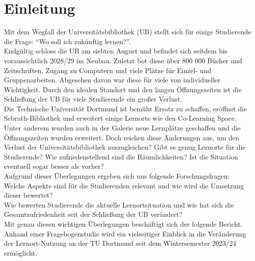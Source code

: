 \documentclass[11pt, a4paper]{article}
\begin{document}
\section{Einleitung}
\label{Einleitung}
Mit dem Wegfall der Universitätsbibliothek (UB) stellt sich für einige Studierende die Frage: “Wo soll ich zukünftig lernen?”.\\
Endgültig schloss die UB am siebten August und befindet sich seitdem bis voraussichtlich 2028/29 im Neubau. Zuletzt bot diese über 800 000 Bücher und Zeitschriften, Zugang zu Computern und viele Plätze für Einzel- und Gruppenarbeiten. Abgesehen davon war diese für viele von individueller Wichtigkeit.
Durch den idealen Standort und den langen Öffnungszeiten ist die Schließung der UB für viele Studierende ein großer Verlust.\\
Die Technische Universität Dortmund ist bemüht Ersatz zu schaffen, eröffnet die Sebrath-Bibliothek und erweitert einige Lernorte wie den Co-Learning Space.
Unter anderem wurden auch in der Galerie neue Lernplätze geschaffen und die Öffnungszeiten wurden erweitert.
Doch reichen diese Änderungen aus, um den Verlust der Universitätsbibliothek auszugleichen?
Gibt es genug Lernorte für die Studierende? Wie zufriedenstellend sind die Räumlichkeiten? Ist die Situation eventuell sogar besser als vorher?\\

Aufgrund dieser Überlegungen ergeben sich uns folgende Forschungsfragen:\\
Welche Aspekte sind für die Studierenden relevant und wie wird die Umsetzung dieser bewertet?\\
Wie bewerten Studierende die aktuelle Lernortsituation und wie hat sich die Gesamtzufriedenheit seit der Schließung der UB verändert?\\
Mit genau diesen wichtigen Überlegungen beschäftigt sich der folgende Bericht.
Anhand einer Fragebogenstudie wird ein vielseitiger Einblick in die Veränderung der Lernort-Nutzung an der TU Dortmund seit dem Wintersemester 2023/24 ermöglicht.
\end{document}
